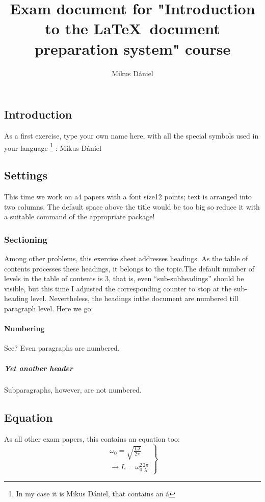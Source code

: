\documentclass[12pt]{article}
\title{Exam document for "Introduction to the \LaTeX ~document preparation system" course}
\author{Mikus Dániel}
\begin{document}
\maketitle
\renewcommand{\footnoterule}{%
  \kern -3pt
  \hrule width 1.3in height 1pt
  \kern 2pt
}
\begin{multicols}{2}
\section{Introduction}
As a first exercise, type your own name here, with all the special symbols used in your language \footnote{In my case it is Mikus Dániel, that contains an á} : Mikus Dániel
\subsection{Settings}
This time we work on a4 papers with a font size12 points; text is arranged into two columns. The default space above the title would be too big so reduce it with a suitable command of the appropriate package!
\subsubsection{Sectioning}
Among other problems, this exercise sheet addresses headings. As the table of contents processes these headings, it belongs to the topic.The default number of levels in the table of contents is 3, that is, even “sub-subheadings” should be visible, but this time I adjusted the corresponding counter to stop at the sub-heading level.  Nevertheless, the headings inthe document are numbered till paragraph level. Here we go:
\paragraph{Numbering}
See? Even paragraphs are numbered. 
\subparagraph{Yet another header}
Subparagraphs, however, are not numbered.
\columnbreak
\subsection{Equation}
As all other exam papers, this contains an equation too:
\begin{equation}
\left.
\begin{array}{c}
   \omega _0 = \sqrt{\frac{L \lambda}{2 \pi}} \\
    \to L = \omega _0^2 \frac{2 \pi}{\lambda}
\end{array}
\right\}
\end{equation}
\tableofcontents
\end{multicols}
\end{document}
